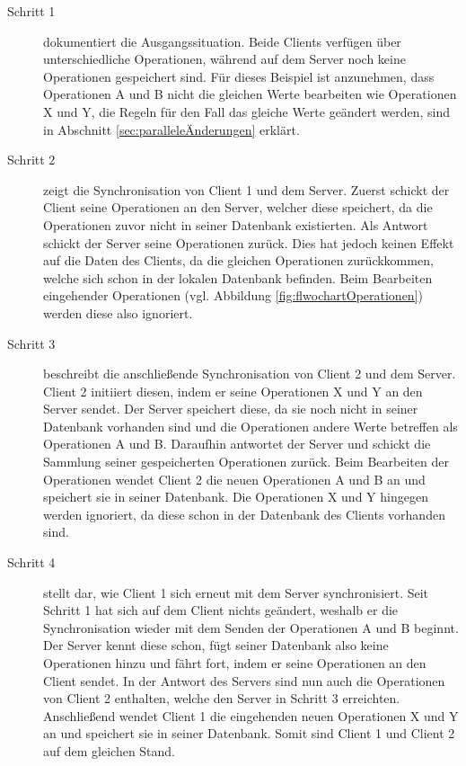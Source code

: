 \documentclass[a4paper, 12pt]{scrreprt}
\begin{document}
\begin{description}
	\item[Schritt 1] dokumentiert die Ausgangssituation. Beide Clients verfügen über unterschiedliche Operationen, während auf dem Server noch keine Operationen gespeichert sind. Für dieses Beispiel ist anzunehmen, dass Operationen A und B nicht die gleichen Werte bearbeiten wie Operationen X und Y, die Regeln für den Fall das gleiche Werte geändert werden, sind in Abschnitt \ref{sec:paralleleÄnderungen} erklärt.
	\item[Schritt 2] zeigt die Synchronisation von Client 1 und dem Server. Zuerst schickt der Client seine Operationen an den Server, welcher diese speichert, da die Operationen zuvor nicht in seiner Datenbank existierten. Als Antwort schickt der Server seine Operationen zurück. Dies hat jedoch keinen Effekt auf die Daten des Clients, da die gleichen Operationen zurückkommen, welche sich schon in der lokalen Datenbank befinden. Beim Bearbeiten eingehender Operationen (vgl. Abbildung \ref{fig:flwochartOperationen}) werden diese also ignoriert.
	\item[Schritt 3] beschreibt die anschließende Synchronisation von Client 2 und dem Server. Client 2 initiiert diesen, indem er seine Operationen X und Y an den Server sendet. Der Server speichert diese, da sie noch nicht in seiner Datenbank vorhanden sind und die Operationen andere Werte betreffen als Operationen A und B. Daraufhin antwortet der Server und schickt die Sammlung seiner gespeicherten Operationen zurück. Beim Bearbeiten der Operationen wendet Client 2 die neuen Operationen A und B an und speichert sie in seiner Datenbank. Die Operationen X und Y hingegen werden ignoriert, da diese schon in der Datenbank des Clients vorhanden sind.
	\item[Schritt 4] stellt dar, wie Client 1 sich erneut mit dem Server synchronisiert. Seit Schritt 1 hat sich auf dem Client nichts geändert, weshalb er die Synchronisation wieder mit dem Senden der Operationen A und B beginnt. Der Server kennt diese schon, fügt seiner Datenbank also keine Operationen hinzu und fährt fort, indem er seine Operationen an den Client sendet. In der Antwort des Servers sind nun auch die Operationen von Client 2 enthalten, welche den Server in Schritt 3 erreichten. Anschließend wendet Client 1 die eingehenden neuen Operationen X und Y an und speichert sie in seiner Datenbank. Somit sind Client 1 und Client 2 auf dem gleichen Stand. 
\end{description} 
\end{document}

